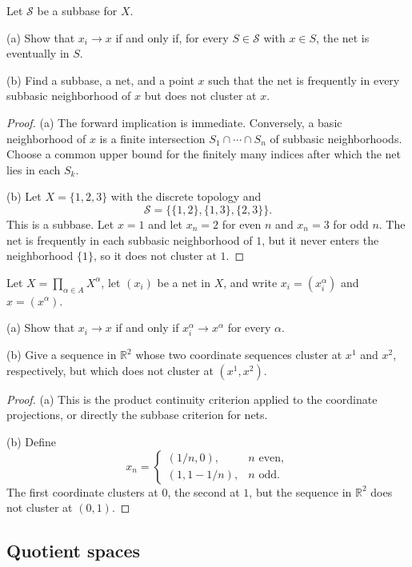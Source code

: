 \begin{ex}
Let $\mathcal{S}$ be a subbase for $X$.

(a) Show that $x_i\to x$ if and only if, for every $S\in\mathcal{S}$ with
$x\in S$, the net is eventually in $S$.

(b) Find a subbase, a net, and a point $x$ such that the net is frequently in
every subbasic neighborhood of $x$ but does not cluster at $x$.
\end{ex}

\begin{proof}
(a) The forward implication is immediate. Conversely, a basic neighborhood
of $x$ is a finite intersection $S_1\cap\cdots\cap S_n$ of subbasic
neighborhoods. Choose a common upper bound for the finitely many indices after
which the net lies in each $S_k$.

(b) Let $X=\{1,2,3\}$ with the discrete topology and
\[
\mathcal{S}=\{\{1,2\},\{1,3\},\{2,3\}\}.
\]
This is a subbase. Let $x=1$ and let $x_n=2$ for even $n$ and $x_n=3$ for odd
$n$. The net is frequently in each subbasic neighborhood of $1$, but it never
enters the neighborhood $\{1\}$, so it does not cluster at $1$.
\end{proof}

\begin{ex}
Let $X=\prod_{\alpha\in A}X^\alpha$, let $(x_i)$ be a net in $X$, and write
$x_i=(x_i^\alpha)$ and $x=(x^\alpha)$.

(a) Show that $x_i\to x$ if and only if
$x_i^\alpha\to x^\alpha$ for every $\alpha$.

(b) Give a sequence in $\mathbb{R}^2$ whose two coordinate sequences cluster
at $x^1$ and $x^2$, respectively, but which does not cluster at
$(x^1,x^2)$.
\end{ex}

\begin{proof}
(a) This is the product continuity criterion applied to the coordinate
projections, or directly the subbase criterion for nets.

(b) Define
\[
x_n=
\begin{cases}
(1/n,0),&n\text{ even},\\
(1,1-1/n),&n\text{ odd}.
\end{cases}
\]
The first coordinate clusters at $0$, the second at $1$, but the sequence in
$\mathbb{R}^2$ does not cluster at $(0,1)$.
\end{proof}

\subsection{Quotient spaces}

